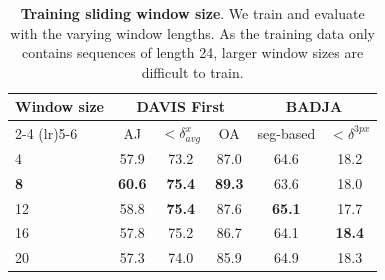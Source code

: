 \begin{table}[t]
\centering
\footnotesize
\caption{ \textbf{Training sliding window size}. We train and evaluate \method with the varying window lengths. As the training data only contains sequences of length 24, larger window sizes are difficult to train.}%
\label{tab:window_size}
\begin{tabular}{ lccccc }
\toprule
\multirow{2}{*}{Window size} & \multicolumn{3}{c}{DAVIS First} & \multicolumn{2}{c}{BADJA} \\
\cmidrule(lr){2-4}
\cmidrule(lr){5-6}
           & AJ            & $< \delta^x_{avg}$ & OA            & seg-based     & \! \! $< \delta^{3px}$ \! \! \\ \midrule
4          & 57.9          & 73.2               & 87.0          & 64.6          & 18.2                         \\
\textbf{8} & \textbf{60.6} & \textbf{75.4}      & \textbf{89.3} & 63.6          & 18.0                         \\
12         & 58.8          & \textbf{75.4}      & 87.6          & \textbf{65.1} & 17.7                         \\
16         & 57.8          & 75.2               & 86.7          & 64.1          & \textbf{18.4}                \\
20         & 57.3          & 74.0               & 85.9          & 64.9          & 18.3                         \\ \bottomrule
\end{tabular}
\end{table}

